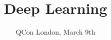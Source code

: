 


\title{Deep Learning}
\author{}
\date{QCon London, March 9th}


\begin{frame}
	\titlepage
\end{frame}







